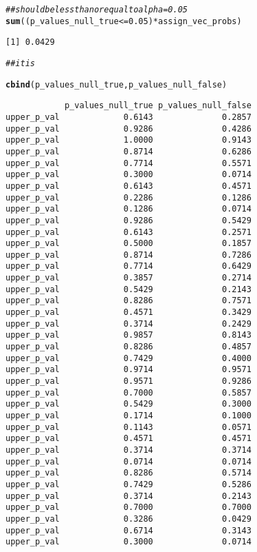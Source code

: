 \documentclass[11pt,leqno]{article}\usepackage[]{graphicx}\usepackage[]{color}
\makeatletter
\newcommand{\hlnum}[1]{\textcolor[rgb]{0.686,0.059,0.569}{#1}}%
\newcommand{\hlcom}[1]{\textcolor[rgb]{0.678,0.584,0.686}{\textit{#1}}}%
\newcommand{\hlopt}[1]{\textcolor[rgb]{0,0,0}{#1}}%
\newcommand{\hlstd}[1]{\textcolor[rgb]{0.345,0.345,0.345}{#1}}%
\newcommand{\hlkwd}[1]{\textcolor[rgb]{0.737,0.353,0.396}{\textbf{#1}}}%
\newenvironment{kframe}{%
 \def\at@end@of@kframe{}%
 \ifinner\ifhmode%
  \def\at@end@of@kframe{\end{minipage}}%
  \begin{minipage}{\columnwidth}%
 \fi\fi%
 \def\FrameCommand##1{\hskip\@totalleftmargin \hskip-\fboxsep
 \colorbox{shadecolor}{##1}\hskip-\fboxsep
     \hskip-\linewidth \hskip-\@totalleftmargin \hskip\columnwidth}%
 \MakeFramed {\advance\hsize-\width
   \@totalleftmargin\z@ \linewidth\hsize
   \@setminipage}}%
 {\par\unskip\endMakeFramed%
 \at@end@of@kframe}
\newenvironment{knitrout}{}{} %
\theoremstyle{newstyle}
\makeatother
\begin{document}
\begin{knitrout}
\begin{kframe}
\begin{alltt}
\hlcom{## should be less than or equal to alpha = 0.05}
\hlkwd{sum}\hlstd{((p_values_null_true} \hlopt{<=} \hlnum{0.05}\hlstd{)} \hlopt{*} \hlstd{assign_vec_probs)}
\end{alltt}
\begin{verbatim}
[1] 0.0429
\end{verbatim}
\begin{alltt}
\hlcom{## it is}

\hlkwd{cbind}\hlstd{(p_values_null_true, p_values_null_false)}
\end{alltt}
\begin{verbatim}
            p_values_null_true p_values_null_false
upper_p_val             0.6143              0.2857
upper_p_val             0.9286              0.4286
upper_p_val             1.0000              0.9143
upper_p_val             0.8714              0.6286
upper_p_val             0.7714              0.5571
upper_p_val             0.3000              0.0714
upper_p_val             0.6143              0.4571
upper_p_val             0.2286              0.1286
upper_p_val             0.1286              0.0714
upper_p_val             0.9286              0.5429
upper_p_val             0.6143              0.2571
upper_p_val             0.5000              0.1857
upper_p_val             0.8714              0.7286
upper_p_val             0.7714              0.6429
upper_p_val             0.3857              0.2714
upper_p_val             0.5429              0.2143
upper_p_val             0.8286              0.7571
upper_p_val             0.4571              0.3429
upper_p_val             0.3714              0.2429
upper_p_val             0.9857              0.8143
upper_p_val             0.8286              0.4857
upper_p_val             0.7429              0.4000
upper_p_val             0.9714              0.9571
upper_p_val             0.9571              0.9286
upper_p_val             0.7000              0.5857
upper_p_val             0.5429              0.3000
upper_p_val             0.1714              0.1000
upper_p_val             0.1143              0.0571
upper_p_val             0.4571              0.4571
upper_p_val             0.3714              0.3714
upper_p_val             0.0714              0.0714
upper_p_val             0.8286              0.5714
upper_p_val             0.7429              0.5286
upper_p_val             0.3714              0.2143
upper_p_val             0.7000              0.7000
upper_p_val             0.3286              0.0429
upper_p_val             0.6714              0.3143
upper_p_val             0.3000              0.0714

\end{verbatim}
\end{kframe}
\end{knitrout}
\end{document}
